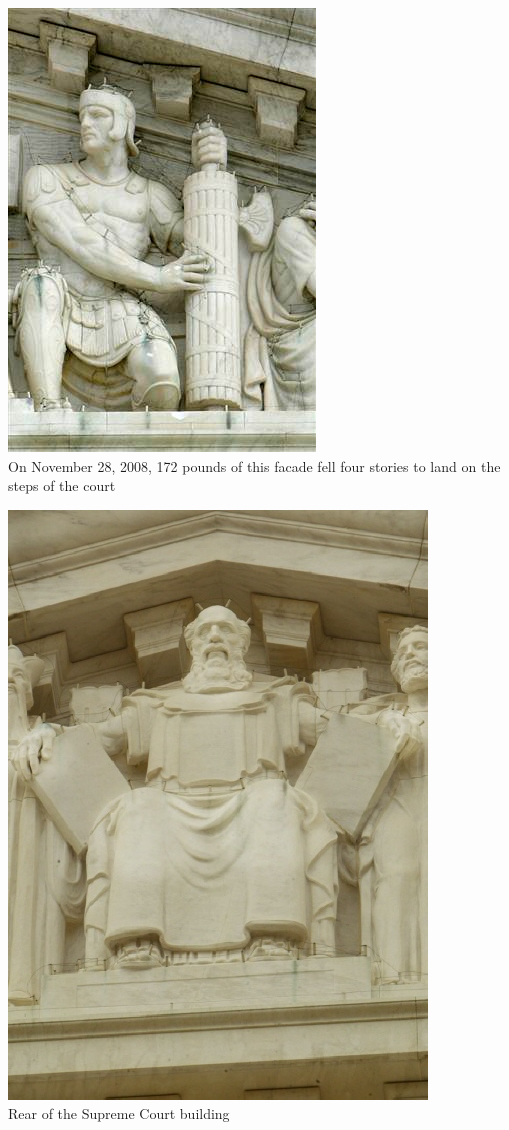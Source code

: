 \begin{frame}
    \centering
    \includegraphics[height=.85\textheight]{img/fasces_west_supcourt.jpg} \\
    \large{ On November 28, 2008, 172 pounds of this facade fell four stories to land on the steps of the court } \\
\end{frame}

\begin{frame}
    \centering
    \includegraphics[height=.9\textheight]{img/moses_east_supcourt.jpg} \\
    \large{ Rear of the Supreme Court building } \\
\end{frame}


